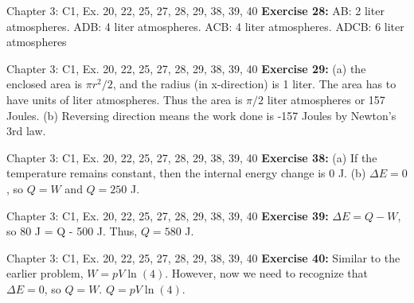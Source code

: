 \documentclass{beamer}
\begin{document}
\begin{frame}{Chapter 3: C1, Ex. 20, 22, 25, 27, 28, 29, 38, 39, 40}
\textbf{Exercise 28:} AB: 2 liter atmospheres. ADB: 4 liter atmospheres.  ACB: 4 liter atmospheres.  ADCB: 6 liter atmospheres
\end{frame}

\begin{frame}{Chapter 3: C1, Ex. 20, 22, 25, 27, 28, 29, 38, 39, 40}
\textbf{Exercise 29:} (a) the enclosed area is $\pi r^2/2$, and the radius (in x-direction) is 1 liter.  The area has to have units of liter atmospheres.  Thus the area is $\pi/2$ liter atmospheres or 157 Joules.  (b) Reversing direction means the work done is -157 Joules by Newton's 3rd law.
\end{frame}

\begin{frame}{Chapter 3: C1, Ex. 20, 22, 25, 27, 28, 29, 38, 39, 40}
\textbf{Exercise 38:} (a) If the temperature remains constant, then the internal energy change is 0 J. (b) $\Delta E = 0$, so $Q = W$ and $Q = 250$ J.
\end{frame}

\begin{frame}{Chapter 3: C1, Ex. 20, 22, 25, 27, 28, 29, 38, 39, 40}
\textbf{Exercise 39:} $\Delta E = Q - W$, so 80 J = Q - 500 J.  Thus, $Q = 580$ J.
\end{frame}


\begin{frame}{Chapter 3: C1, Ex. 20, 22, 25, 27, 28, 29, 38, 39, 40}
\textbf{Exercise 40:} Similar to the earlier problem, $W = pV \ln(4)$.  However, now we need to recognize that $\Delta E = 0$, so $Q = W$.  $Q = pV\ln(4)$.
\end{frame}
\end{document}
